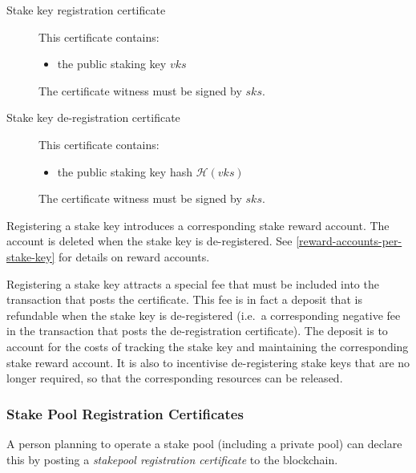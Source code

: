 \documentclass[11pt,a4paper]{article}
\begin{document}
\begin{description}
\item[Stake key registration certificate]
This certificate contains:

\begin{itemize}
\item
  the public staking key \(vks\)
\end{itemize}

The certificate witness must be signed by \(sks\).
\item[Stake key de-registration certificate]
This certificate contains:

\begin{itemize}
\item
  the public staking key hash \(\mathcal{H}(vks)\)
\end{itemize}

The certificate witness must be signed by \(sks\).
\end{description}

Registering a stake key introduces a corresponding stake reward account.
The account is deleted when the stake key is de-registered. See
\cref{reward-accounts-per-stake-key} for details on reward accounts.

Registering a stake key attracts a special fee that must be included
into the transaction that posts the certificate. This fee is in fact a
deposit that is refundable when the stake key is de-registered (i.e.~a
corresponding negative fee in the transaction that posts the
de-registration certificate). The deposit is to account for the costs of
tracking the stake key and maintaining the corresponding stake reward
account. It is also to incentivise de-registering stake keys that are no
longer required, so that the corresponding resources can be released.

\subsubsection{Stake Pool Registration Certificates}
\label{stake-pool-registration-certificates}

A person planning to operate a stake pool (including a private pool) can
declare this by posting a \emph{stakepool registration certificate} to
the blockchain.
\end{document}
